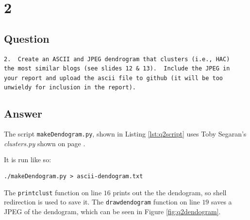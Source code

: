 \documentclass[letterpaper,11pt]{article}
\begin{document}
\newpage

\section*{2}

\subsection*{Question}

\begin{verbatim}
2.  Create an ASCII and JPEG dendrogram that clusters (i.e., HAC)
the most similar blogs (see slides 12 & 13).  Include the JPEG in
your report and upload the ascii file to github (it will be too
unwieldy for inclusion in the report).
\end{verbatim}

\subsection*{Answer}

The script \verb+makeDendogram.py+, shown in Listing \ref{lst:q2script} uses Toby Segaran's \emph{clusters.py} \cite{pci} shown on page \pageref{lst:appSegaran2}.



It is run like so:
\begin{lstlisting}[frame=single]
./makeDendogram.py > ascii-dendogram.txt
\end{lstlisting}

The \verb+printclust+ function on line $16$ prints out the the dendogram, so shell redirection is used to save it.  The \verb+drawdendogram+ function on line $19$ saves a JPEG of the dendogram, which can be seen in Figure \ref{fig:q2dendogram}.
\end{document}
